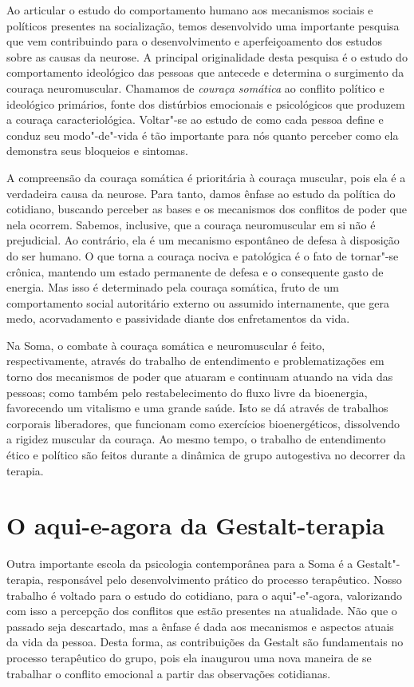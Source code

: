 Ao articular o estudo do comportamento humano aos mecanismos sociais e
políticos presentes na socialização, temos desenvolvido uma importante
pesquisa que vem contribuindo para o desenvolvimento e aperfeiçoamento
dos estudos sobre as causas da neurose. A principal originalidade desta
pesquisa é o estudo do comportamento ideológico das pessoas que antecede
e determina o surgimento da couraça neuromuscular. Chamamos de
\emph{couraça somática} ao conflito político e ideológico primários,
fonte dos distúrbios emocionais e psicológicos que produzem a couraça
caracteriológica. Voltar"-se ao estudo de como cada pessoa define e
conduz seu modo"-de"-vida é tão importante para nós quanto perceber como
ela demonstra seus bloqueios e sintomas.

A compreensão da couraça somática é prioritária à couraça muscular, pois
ela é a verdadeira causa da neurose. Para tanto, damos ênfase ao estudo
da política do cotidiano, buscando perceber as bases e os mecanismos dos
conflitos de poder que nela ocorrem. Sabemos, inclusive, que a couraça
neuromuscular em si não é prejudicial. Ao contrário, ela é um mecanismo
espontâneo de defesa à disposição do ser humano. O que torna a couraça
nociva e patológica é o fato de tornar"-se crônica, mantendo um estado
permanente de defesa e o consequente gasto de energia. Mas isso é
determinado pela couraça somática, fruto de um comportamento social
autoritário externo ou assumido internamente, que gera medo,
acorvadamento e passividade diante dos enfretamentos da vida.

Na Soma, o combate à couraça somática e neuromuscular é feito,
respectivamente, através do trabalho de entendimento e problematizações
em torno dos mecanismos de poder que atuaram e continuam atuando na vida
das pessoas; como também pelo restabelecimento do fluxo livre da
bioenergia, favorecendo um vitalismo e uma grande saúde. Isto se dá
através de trabalhos corporais liberadores, que funcionam como
exercícios bioenergéticos, dissolvendo a rigidez muscular da couraça. Ao
mesmo tempo, o trabalho de entendimento ético e político são feitos
durante a dinâmica de grupo autogestiva no decorrer da terapia.

\section{O aqui-e-agora da Gestalt-terapia}

Outra importante escola da psicologia contemporânea para a Soma é a
Gestalt"-terapia, responsável pelo desenvolvimento prático do processo
terapêutico. Nosso trabalho é voltado para o estudo do cotidiano, para o
aqui"-e"-agora, valorizando com isso a percepção dos conflitos que estão
presentes na atualidade. Não que o passado seja descartado, mas a ênfase
é dada aos mecanismos e aspectos atuais da vida da pessoa. Desta forma,
as contribuições da Gestalt são fundamentais no processo terapêutico do
grupo, pois ela inaugurou uma nova maneira de se trabalhar o conflito
emocional a partir das observações cotidianas.

